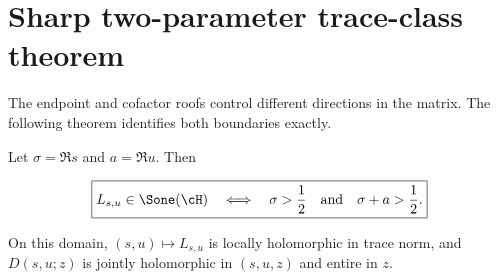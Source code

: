 \section{Sharp two-parameter trace-class theorem}
\label{sec:traceclass}

The endpoint and cofactor roofs control different directions in the matrix.
The following theorem identifies both boundaries exactly.

\begin{theorem}
\label{thm:traceclass}
Let \(\sigma=\Re s\) and \(a=\Re u\).  Then

\begin{equation}
 \boxed{
 L_{s,u}\in\Sone(\cH)
 \quad\Longleftrightarrow\quad
 \sigma>\frac12
 \quad\text{and}\quad
 \sigma+a>\frac12.}
\label{eq:S1-domain}
\end{equation}

On this domain, \((s,u)\mapsto L_{s,u}\) is locally holomorphic in trace norm,
and \(D(s,u;z)\) is jointly holomorphic in \((s,u,z)\) and entire in \(z\).
\end{theorem}

